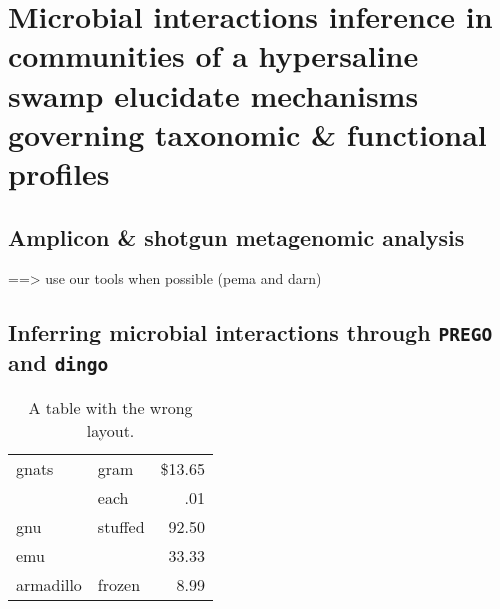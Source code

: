 % 
% 

\chapter{Microbial interactions inference in communities of a hypersaline 
         swamp elucidate mechanisms governing taxonomic \& functional profiles}
\label{cha:swamp}




\section{Amplicon \& shotgun metagenomic analysis}


==> use our tools when possible (pema and darn)

\section{Inferring microbial interactions through \texttt{PREGO} and \texttt{dingo}}






\begin{table}
  \centering
  \begin{tabular}{||l|lr||} \hline
    gnats     & gram      & \$13.65 \\ \cline{2-3}
              & each      & .01 \\ \hline
    gnu       & stuffed   & 92.50 \\ \cline{1-1} \cline{3-3}
    emu       &           & 33.33 \\ \hline
    armadillo & frozen    & 8.99 \\ \hline
  \end{tabular}
  \caption{A table with the wrong layout.}
  \label{tab:wrong}
\end{table}




